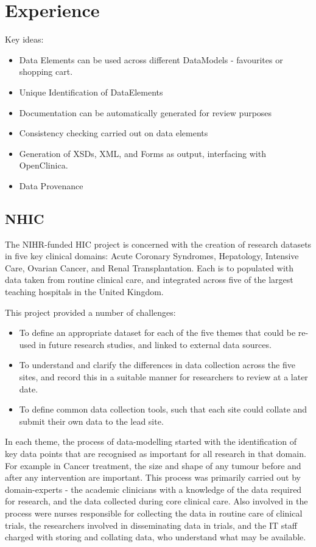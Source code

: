 \section{Experience}

Key ideas:

\begin{itemize}
	\item Data Elements can be used across different DataModels - favourites or shopping cart.
	\item Unique Identification of DataElements 
	\item Documentation can be automatically generated for review purposes
	\item Consistency checking carried out on data elements
	\item Generation of XSDs, XML, and Forms as output, interfacing with OpenClinica.
	\item Data Provenance
\end{itemize}


\subsection{NHIC}

The NIHR-funded HIC project is concerned with the creation of research
datasets in five key clinical domains: Acute Coronary Syndromes,
Hepatology, Intensive Care, Ovarian Cancer, and Renal Transplantation.
Each is to populated with data taken from routine clinical care, and
integrated across five of the largest teaching hospitals in the United
Kingdom.

This project provided a number of challenges:

\begin{itemize}
\item To define an appropriate dataset for each of the five themes
  that could be re-used in future research studies, and linked to
  external data sources.
\item To understand and clarify the differences in data collection
  across the five sites, and record this in a suitable manner for
  researchers to review at a later date.
\item To define common data collection tools, such that each site
  could collate and submit their own data to the lead site.

\end{itemize}

In each theme, the process of data-modelling started with the
identification of key data points that are recognised as important for
all research in that domain.  For example in Cancer treatment, the
size and shape of any tumour before and after any intervention are
important.  This process was primarily carried out by domain-experts -
the academic clinicians with a knowledge of the data required for
research, and the data collected during core clinical care.  Also
involved in the process were nurses responsible for collecting the
data in routine care of clinical trials, the researchers involved in
disseminating data in trials, and the IT staff charged with storing
and collating data, who understand what may be available.

